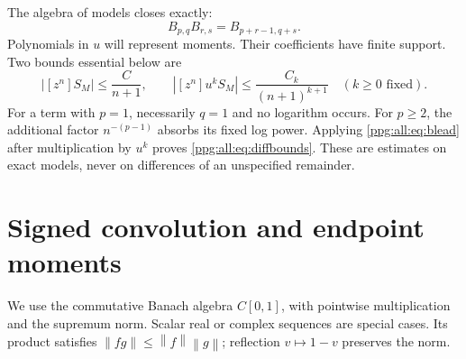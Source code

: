 \documentclass[11pt,letterpaper]{article}
\theoremstyle{remark}\newtheorem{remark}[theorem]{Remark}
\numberwithin{equation}{section}
\newcommand{\norm}[1]{\left\|#1\right\|}
\begin{document}
The algebra of models closes exactly:
\begin{equation}\label{ppg:all:eq:product}
 B_{p,q}B_{r,s}=B_{p+r-1,q+s}.
\end{equation}
Polynomials in $u$ will represent moments. Their coefficients have finite support. Two bounds essential below are
\begin{equation}\label{ppg:all:eq:diffbounds}
 |[z^n]S_M|\le\frac{C}{n+1},\qquad
 |[z^n]u^kS_M|\le\frac{C_k}{(n+1)^{k+1}}\quad(k\ge0\text{ fixed}).
\end{equation}
For a term with $p=1$, necessarily $q=1$ and no logarithm occurs. For $p\ge2$, the additional factor $n^{-(p-1)}$ absorbs its fixed log power. Applying \eqref{ppg:all:eq:blead} after multiplication by $u^k$ proves \eqref{ppg:all:eq:diffbounds}. These are estimates on exact models, never on differences of an unspecified remainder.

\section{Signed convolution and endpoint moments}\label{ppg:all:sec:convolution}
We use the commutative Banach algebra $C[0,1]$, with pointwise multiplication and the supremum norm. Scalar real or complex sequences are special cases. Its product satisfies $\norm{fg}\le\norm f\norm g$; reflection $v\mapsto1-v$ preserves the norm.
\end{document}
